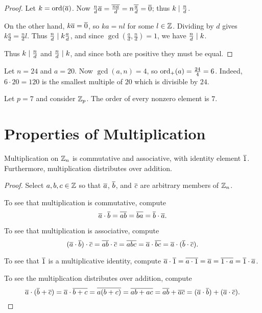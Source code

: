 \documentclass{amsart}
\begin{document}
\begin{proof}
Let $k = \text{\rm{ord}}(\overline{a})$.  Now $\frac{n}{d} \overline{a} = \overline{\frac{na}{d}} = n \overline{\frac{a}{d}} = \overline{0}$;
thus $k \mid \frac{n}{d}$.

On the other hand, $k\overline{a} = \overline{0}$, so $ka = nl$ for some $l \in \mathbb{Z}$.
Dividing by $d$ gives $k\frac{a}{d} = \frac{n}{d} l$.
Thus $\frac{n}{d} \mid k \frac{a}{d}$, and since $\gcd(\frac{a}{d},\frac{n}{d}) = 1$,
we have $\frac{n}{d} \mid k$.

Thus $k \mid \frac{n}{d}$ and $\frac{n}{d} \mid k$, and since both are positive
they must be equal.
\end{proof}

\begin{Exm}
Let $n = 24$ and $a = 20$.
Now $\gcd(a,n) = 4$, so $\text{\rm{ord}}_+(a) = \frac{24}{4} = 6$.
Indeed, $6 \cdot 20 = 120$ is the smallest multiple of $20$
which is divisible by $24$.
\end{Exm}

\begin{Exm}
Let $p = 7$ and consider $\mathbb{Z}_p$.  The order of every nonzero element is $7$.
\end{Exm}

\newpage

\section{Properties of Multiplication}

\begin{Prop}
Multiplication on $\mathbb{Z}_{n}$ is commutative and associative, with
identity element $\overline{1}$. Furthermore, multiplication distributes
over addition.
\end{Prop}

\begin{proof}
Select $a,b,c \in \mathbb{Z}$ so that $\overline{a}$, $\overline{b}$, and $\overline{c}$
are arbitrary members of $\mathbb{Z}_{n}$.

To see that multiplication is commutative, compute
\[ \overline{a}\cdot\overline{b} = \overline{ab} = \overline{ba} = \overline{b} \cdot \overline{a} . \]

To see that multiplication is associative, compute
\[ (\overline{a}\cdot\overline{b})\cdot\overline{c} = \overline{ab}\cdot\overline{c}
        = \overline{abc} = \overline{a}\cdot\overline{bc}
        = \overline{a}\cdot(\overline{b}\cdot\overline{c}) . \]

To see that $\overline{1}$ is a multiplicative identity, compute
$\overline{a}\cdot\overline{1} = \overline{a \cdot 1} = \overline{a}
        = \overline{1 \cdot a} = \overline{1} \cdot \overline{a}$.

To see the multiplication distributes over addition, compute
\[ \overline{a}\cdot(\overline{b}+\overline{c}) = \overline{a}\cdot\overline{b+c}
        = \overline{a(b+c)} = \overline{ab+ac} = \overline{ab}+\overline{ac}
        = (\overline{a}\cdot\overline{b})+(\overline{a}\cdot\overline{c}) . \]
\end{proof}
\end{document}
